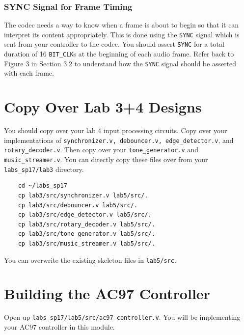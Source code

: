 \documentclass[11pt]{article}
\begin{document}
\subsubsection{SYNC Signal for Frame Timing}
The codec needs a way to know when a frame is about to begin so that it can interpret its content appropriately. This is done using the \verb|SYNC| signal which is sent from your controller to the codec. You should assert \verb|SYNC| for a total duration of 16 \verb|BIT_CLK|s at the beginning of each audio frame. Refer back to Figure 3 in Section 3.2 to understand how the \verb|SYNC| signal should be asserted with each frame.

\section{Copy Over Lab 3+4 Designs}
You should copy over your lab 4 input processing circuits. Copy over your implementations of \verb|synchronizer.v, debouncer.v, edge_detector.v|, and \verb|rotary_decoder.v|. Then copy over your \verb|tone_generator.v| and \verb|music_streamer.v|. You can directly copy these files over from your \verb|labs_sp17/lab3| directory.

\begin{verbatim}
	cd ~/labs_sp17
	cp lab3/src/synchronizer.v lab5/src/.
	cp lab3/src/debouncer.v lab5/src/.
	cp lab3/src/edge_detector.v lab5/src/.
	cp lab3/src/rotary_decoder.v lab5/src/.
	cp lab3/src/tone_generator.v lab5/src/.
	cp lab3/src/music_streamer.v lab5/src/.
\end{verbatim}

You can overwrite the existing skeleton files in \verb|lab5/src|.

\section{Building the AC97 Controller}

Open up \verb|labs_sp17/lab5/src/ac97_controller.v|. You will be implementing your AC97 controller in this module.
\end{document}
